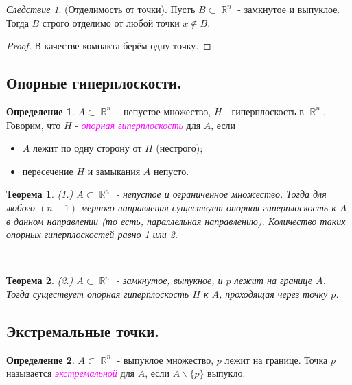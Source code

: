 \documentclass[a4paper,100pt]{article}
\theoremstyle{indented}
\newtheorem{theorem}{Теорема}
\theoremstyle{definition}
\newtheorem{defn}{Определение}
\theoremstyle{remark}
\newtheorem{cons}{Следствие}
\DeclareMathOperator{\RR}{\mathbb{R}}
\begin{document}
\begin{cons}
    (Отделимость от точки). Пусть $B \subset \RR^n$ - замкнутое и выпуклое. Тогда $B$ строго отделимо от любой точки $x \notin B$.
\end{cons}

\begin{proof}
    В качестве компакта берём одну точку.
\end{proof}

\subsection{Опорные гиперплоскости.}

\begin{defn}
    $A \subset \RR^n$ - непустое множество, $H$ - гиперплоскость в $\RR^n$. Говорим, что $H$ - \textit{\textcolor{magenta}{\hypertarget{s100}{опорная гиперплоскость}}} для $A$, если

    \begin{itemize}
        \item $A$ лежит по одну сторону от $H$ (нестрого); 
        \item пересечение $H$ и замыкания $A$ непусто.
    \end{itemize}
\end{defn}

\begin{theorem}
    (1.) $A \subset \RR^n$ - непустое и ограниченное множество. Тогда для любого $(n-1)$-мерного направления существует опорная гиперплоскость к $A$ в данном направлении (то есть, параллельная направлению). Количество таких опорных гиперплоскостей равно 1 или 2.
\end{theorem} \

\begin{theorem}
    (2.) $A \subset \RR^n$ - замкнутое, выпукное, и $p$ лежит на границе $A$. Тогда существует опорная гиперплоскость $H$ к $A$, проходящая через точку $p$. 
\end{theorem}

\subsection{Экстремальные точки.}

\begin{defn}
    $A \subset \RR^n$ - выпуклое множество, $p$ лежит на границе. Точка $p$ называется \textit{\textcolor{magenta}{\hypertarget{s101}{экстремальной}}} для $A$, если $A \backslash \{p\}$ выпукло.
\end{defn}
\end{document}
